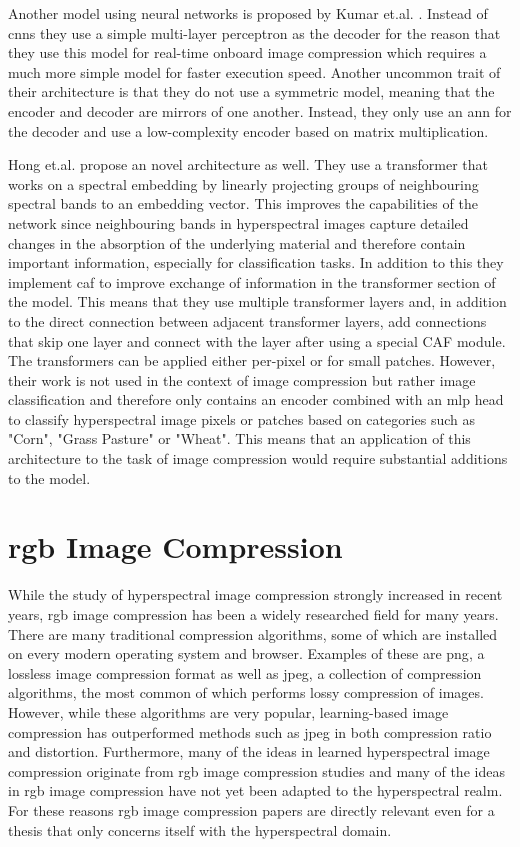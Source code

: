 Another model using neural networks is proposed by Kumar et.al. \citep{leal-taixe_onboard_2019}. Instead of \acp{cnn} they use a simple multi-layer perceptron as the decoder for the reason that they use this model for real-time onboard image compression which requires a much more simple model for faster execution speed. Another uncommon trait of their architecture is that they do not use a symmetric model, meaning that the encoder and decoder are mirrors of one another. Instead, they only use an \ac{ann} for the decoder and use a low-complexity encoder based on matrix multiplication.

Hong et.al. \citep{hong_spectralformer_2022} propose an novel architecture as well. They use a transformer that works on a spectral embedding by linearly projecting groups of neighbouring spectral bands to an embedding vector. This improves the capabilities of the network since neighbouring bands in hyperspectral images capture detailed changes in the absorption of the underlying material and therefore contain important information, especially for classification tasks.
In addition to this they implement \ac{caf} to improve exchange of information in the transformer section of the model. This means that they use multiple transformer layers and, in addition to the direct connection between adjacent transformer layers, add connections that skip one layer and connect with the layer after using a special CAF module.
The transformers can be applied either per-pixel or for small patches. However, their work is not used in the context of image compression but rather image classification and therefore only contains an encoder combined with an \ac{mlp} head to classify hyperspectral image pixels or patches based on categories such as "Corn", "Grass Pasture" or "Wheat". This means that an application of this architecture to the task of image compression would require substantial additions to the model. 
\section{\ac{rgb} Image Compression \label{sec:ch2rgb}}
While the study of hyperspectral image compression strongly increased in recent years, \ac{rgb} image compression has been a widely researched field for many years. There are many traditional compression algorithms, some of which are installed on every modern operating system and browser. Examples of these are \ac{png}, a lossless image compression format as well as \ac{jpeg}, a collection of compression algorithms, the most common of which performs lossy compression of images. 
However, while these algorithms are very popular, learning-based image compression has outperformed methods such as \ac{jpeg} in both compression ratio and distortion. Furthermore, many of the ideas in learned hyperspectral image compression originate from \ac{rgb} image compression studies and many of the ideas in \ac{rgb} image compression have not yet been adapted to the hyperspectral realm. For these reasons \ac{rgb} image compression papers are directly relevant even for a thesis that only concerns itself with the hyperspectral domain.
